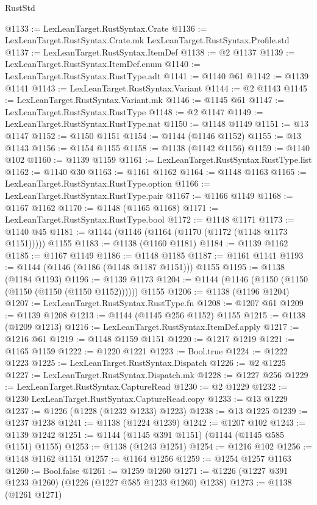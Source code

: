 \begin{lexlean}{RustStd}
\begin{coremodule}
@1133 := LexLeanTarget.RustSyntax.Crate
@1136 := LexLeanTarget.RustSyntax.Crate.mk LexLeanTarget.RustSyntax.Profile.std
@1137 := LexLeanTarget.RustSyntax.ItemDef
@1138 := @2 @1137
@1139 := LexLeanTarget.RustSyntax.ItemDef.enum
@1140 := LexLeanTarget.RustSyntax.RustType.adt
@1141 := @1140 @61
@1142 := @1139 @1141
@1143 := LexLeanTarget.RustSyntax.Variant
@1144 := @2 @1143
@1145 := LexLeanTarget.RustSyntax.Variant.mk
@1146 := @1145 @61
@1147 := LexLeanTarget.RustSyntax.RustType
@1148 := @2 @1147
@1149 := LexLeanTarget.RustSyntax.RustType.nat
@1150 := @1148 @1149
@1151 := @13 @1147
@1152 := @1150 @1151
@1154 := @1144 (@1146 @1152)
@1155 := @13 @1143
@1156 := @1154 @1155
@1158 := @1138 (@1142 @1156)
@1159 := @1140 @102
@1160 := @1139 @1159
@1161 := LexLeanTarget.RustSyntax.RustType.list
@1162 := @1140 @30
@1163 := @1161 @1162
@1164 := @1148 @1163
@1165 := LexLeanTarget.RustSyntax.RustType.option
@1166 := LexLeanTarget.RustSyntax.RustType.pair
@1167 := @1166 @1149
@1168 := @1167 @1162
@1170 := @1148 (@1165 @1168)
@1171 := LexLeanTarget.RustSyntax.RustType.bool
@1172 := @1148 @1171
@1173 := @1140 @45
@1181 := @1144 (@1146 (@1164 (@1170 (@1172 (@1148 @1173 @1151))))) @1155
@1183 := @1138 (@1160 @1181)
@1184 := @1139 @1162
@1185 := @1167 @1149
@1186 := @1148 @1185
@1187 := @1161 @1141
@1193 := @1144 (@1146 (@1186 (@1148 @1187 @1151))) @1155
@1195 := @1138 (@1184 @1193)
@1196 := @1139 @1173
@1204 := @1144 (@1146 (@1150 (@1150 (@1150 (@1150 (@1150 @1152)))))) @1155
@1206 := @1138 (@1196 @1204)
@1207 := LexLeanTarget.RustSyntax.RustType.fn
@1208 := @1207 @61
@1209 := @1139 @1208
@1213 := @1144 (@1145 @256 @1152) @1155
@1215 := @1138 (@1209 @1213)
@1216 := LexLeanTarget.RustSyntax.ItemDef.apply
@1217 := @1216 @61
@1219 := @1148 @1159 @1151
@1220 := @1217 @1219
@1221 := @1165 @1159
@1222 := @1220 @1221
@1223 := Bool.true
@1224 := @1222 @1223
@1225 := LexLeanTarget.RustSyntax.Dispatch
@1226 := @2 @1225
@1227 := LexLeanTarget.RustSyntax.Dispatch.mk
@1228 := @1227 @256
@1229 := LexLeanTarget.RustSyntax.CaptureRead
@1230 := @2 @1229
@1232 := @1230 LexLeanTarget.RustSyntax.CaptureRead.copy
@1233 := @13 @1229
@1237 := @1226 (@1228 (@1232 @1233) @1223)
@1238 := @13 @1225
@1239 := @1237 @1238
@1241 := @1138 (@1224 @1239)
@1242 := @1207 @102
@1243 := @1139 @1242
@1251 := @1144 (@1145 @391 @1151) (@1144 (@1145 @585 @1151) @1155)
@1253 := @1138 (@1243 @1251)
@1254 := @1216 @102
@1256 := @1148 @1162 @1151
@1257 := @1164 @1256
@1259 := @1254 @1257 @1163
@1260 := Bool.false
@1261 := @1259 @1260
@1271 := @1226 (@1227 @391 @1233 @1260) (@1226 (@1227 @585 @1233 @1260) @1238)
@1273 := @1138 (@1261 @1271)

\end{coremodule}
\end{lexlean}
